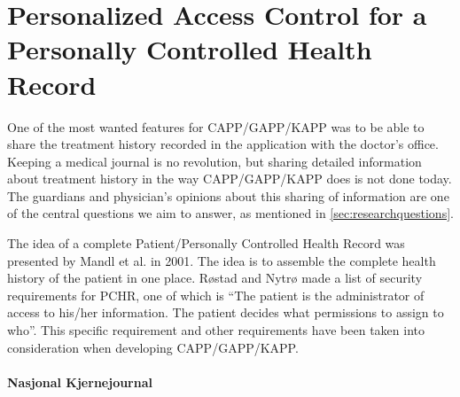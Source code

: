 \section{Personalized Access Control for a Personally Controlled Health Record}
\label{personalhealthrecords}

One of the most wanted features for CAPP/GAPP/KAPP was to be able to share the treatment history recorded in the application with the doctor's office. Keeping a medical journal is no revolution, but sharing detailed information about treatment history in the way CAPP/GAPP/KAPP does is not done today. The guardians and physician's opinions about this sharing of information are one of the central questions we aim to answer, as mentioned in \ref{sec:researchquestions}.

The idea of a complete Patient/Personally Controlled Health Record was presented by Mandl et al.\cite{mandl2007indivo} in 2001. The idea is to assemble the complete health history of the patient in one place. Røstad and Nytrø \cite{rostad2008personalized} made a list of security requirements for PCHR, one of which is ``The patient is the administrator of access to his/her information. The patient decides what permissions to assign to who''. This specific requirement and other requirements\cite{rostad2008personalized} have been taken into consideration when developing CAPP/GAPP/KAPP. 



\paragraph{Nasjonal Kjernejournal}
